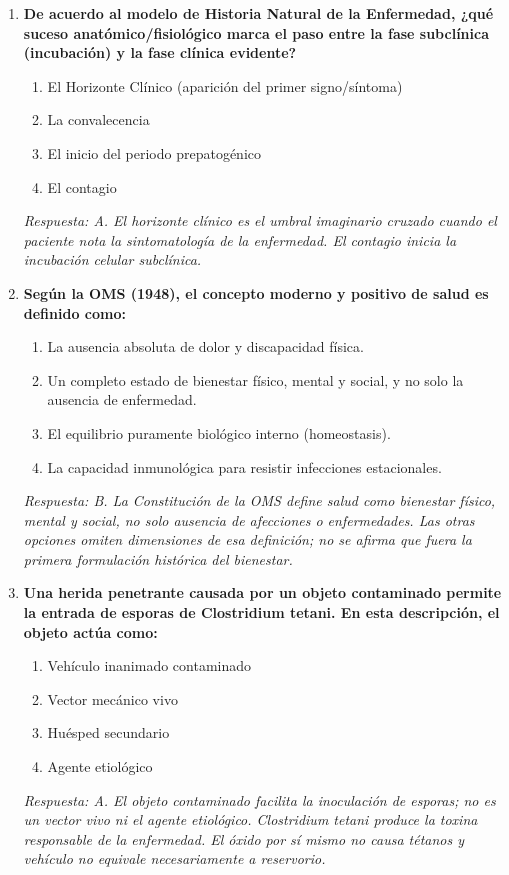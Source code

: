 \begin{enumerate}[label=\textbf{\arabic*.}]
    \item \textbf{De acuerdo al modelo de Historia Natural de la Enfermedad, ¿qué suceso anatómico/fisiológico marca el paso entre la fase subclínica (incubación) y la fase clínica evidente?}
    \begin{enumerate}
        \item[A)] El Horizonte Clínico (aparición del primer signo/síntoma)
        \item[B)] La convalecencia
        \item[C)] El inicio del periodo prepatogénico
        \item[D)] El contagio
    \end{enumerate}
    \textit{Respuesta: A. El horizonte clínico es el umbral imaginario cruzado cuando el paciente nota la sintomatología de la enfermedad. El contagio inicia la incubación celular subclínica.}

    \item \textbf{Según la OMS (1948), el concepto moderno y positivo de salud es definido como:}
    \begin{enumerate}
        \item[A)] La ausencia absoluta de dolor y discapacidad física.
        \item[B)] Un completo estado de bienestar físico, mental y social, y no solo la ausencia de enfermedad.
        \item[C)] El equilibrio puramente biológico interno (homeostasis).
        \item[D)] La capacidad inmunológica para resistir infecciones estacionales.
    \end{enumerate}
    \textit{Respuesta: B. La Constitución de la OMS define salud como bienestar físico, mental y social, no solo ausencia de afecciones o enfermedades. Las otras opciones omiten dimensiones de esa definición; no se afirma que fuera la primera formulación histórica del bienestar.}

    \item \textbf{Una herida penetrante causada por un objeto contaminado permite la entrada de esporas de Clostridium tetani. En esta descripción, el objeto actúa como:}
    \begin{enumerate}
        \item[A)] Vehículo inanimado contaminado
        \item[B)] Vector mecánico vivo
        \item[C)] Huésped secundario
        \item[D)] Agente etiológico
    \end{enumerate}
    \textit{Respuesta: A. El objeto contaminado facilita la inoculación de esporas; no es un vector vivo ni el agente etiológico. Clostridium tetani produce la toxina responsable de la enfermedad. El óxido por sí mismo no causa tétanos y vehículo no equivale necesariamente a reservorio.}


\end{enumerate}
